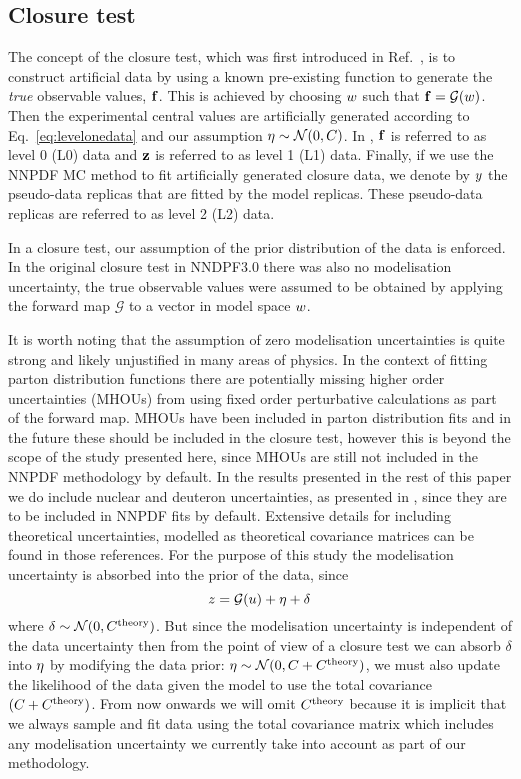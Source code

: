 \subsection{Closure test}
\label{sec:closure-test}

The concept of the closure test, which was first introduced in
Ref.~\cite{nnpdf30}, is to construct artificial data by using a known
pre-existing function to generate the {\em true} observable values, $\mathbf{f}$.
This is achieved by choosing $w$ such that $\mathbf{f} =
\mathcal{G}(w)$. Then the experimental central values are artificially
generated according to Eq.~\ref{eq:levelonedata} and our assumption $\mathbf{\eta}
\sim \mathcal{N}(0, C)$. In \cite{nnpdf30}, $\mathbf{f}$ is referred to as
level 0 (L0) data and $\mathbf{z}$ is referred to as level 1 (L1) data.
Finally, if we use the NNPDF MC method to fit artificially generated closure
data, we denote by $y$ the pseudo-data replicas that are fitted by the
model replicas. These pseudo-data replicas are referred to as level 2 (L2) data.

In a closure test, our assumption of the prior distribution of the data is
enforced. In the original closure test in NNDPF3.0 there was also no
modelisation uncertainty, the true observable values were assumed to be obtained
by applying the forward map $\mathcal G$ to a vector in model space $w$.

It is worth noting that the assumption of zero modelisation uncertainties is
quite strong and likely unjustified in many areas of physics. In the context of
fitting parton distribution functions there are potentially missing higher order
uncertainties (MHOUs) from using fixed order perturbative calculations as part
of the forward map. MHOUs have been included in parton distribution fits
\cite{AbdulKhalek:2019ihb} and in the future these should be included in the
closure test, however this is beyond the scope of the study presented here,
since MHOUs are still not included in the NNPDF methodology by default. In the
results presented in the rest of this paper we do include nuclear and deuteron
uncertainties, as presented in \cite{Ball:2018twp, Ball:2020xqw}, since they are
to be included in NNPDF fits by default. Extensive details for including
theoretical uncertainties, modelled as theoretical covariance matrices can be
found in those references. For the purpose of this study the modelisation
uncertainty is absorbed into the prior of the data, since
\begin{equation}
    z = \mathcal{G}(u) + \eta + \delta
\end{equation}
where $\delta \sim \mathcal{N}(0, C^{\rm theory})$. But since the modelisation
uncertainty is independent of the data uncertainty then from the point of view
of a closure test we can absorb $\delta$ into $\eta$ by modifying the data
prior: $\eta \sim \mathcal{N}(0, C + C^{\rm theory})$, we must also update the
likelihood of the data given the model to use the total covariance $(C + C^{\rm
theory})$. From now onwards we will omit $C^{\rm theory}$ because it is
implicit that we always sample and fit data using the total covariance matrix
which includes any modelisation uncertainty we currently take into account as
part of our methodology.


